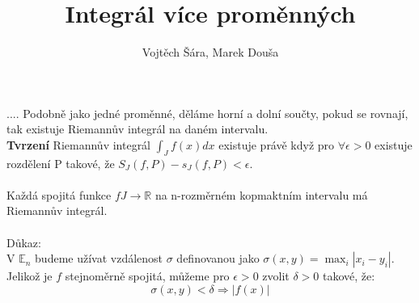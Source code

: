 \documentclass{article}
\title{Integrál více proměnných}
\author{Vojtěch Šára, Marek Douša}
\begin{document}
\maketitle
....
Podobně jako jedné proměnné, děláme horní a dolní součty, pokud se rovnají, tak existuje Riemannův integrál na daném intervalu.\\
\textbf{Tvrzení} Riemannův integrál $\int_{J}f(x)dx$ existuje právě když pro $\forall \epsilon > 0$ existuje rozdělení P takové, že $S_{J}(f,P) - s_{J}(f,P) < \epsilon$.\\\\

Každá spojitá funkce $f J \rightarrow \mathbb{R}$ na n-rozměrném kopmaktním intervalu má Riemannův integrál.\\\\

Důkaz:\\
V $\mathbb{E}_{n}$ budeme užívat vzdálenost $\sigma$ definovanou jako $\sigma (x,y) = \max_{i} |x_{i} - y_{i}|$. Jelikož je $f$ stejnoměrně spojitá, můžeme pro $\epsilon > 0$ 
zvolit $\delta > 0$ takové, že:
$$\sigma (x,y) < \delta \Rightarrow |f(x)|$$
\end{document}
